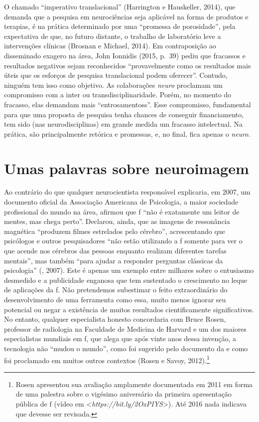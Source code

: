 O chamado ``imperativo translacional'' (Harrington e Hauskeller, 2014),
que demanda que a pesquisa em neurociências seja aplicável na forma de
produtos e terapias, é na prática determinado por uma ``promessa de
porosidade'', pela expectativa de que, no futuro distante, o trabalho de
laboratório leve a intervenções clínicas (Brosnan e Michael, 2014). Em
contraposição ao disseminado exagero na área, John Ionnidis (2015, p.~39)
pediu que fracassos e resultados negativos sejam reconhecidos
``provavelmente como os resultados mais úteis que os esforços de
pesquisa translacional podem oferecer''. Contudo, ninguém tem isso como
objetivo. As colaborações \emph{neuro} proclamam um compromisso com a
inter ou transdisciplinaridade. Porém, no momento do fracasso, elas
demandam mais ``entrosamentoss''. Esse compromisso, fundamental para que
uma proposta de pesquisa tenha chances de conseguir financiamento, tem
sido (nas neurodisciplinas) em grande medida um fracasso intelectual. Na
prática, são principalmente retórica e promessas, e, no final, fica
apenas o \emph{neuro}.

\section{Umas palavras sobre neuroimagem}

Ao contrário do que qualquer neurocientista responsável explicaria, em
2007, um documento oficial da Associação Americana de Psicologia, a maior
sociedade profissional do mundo na área, afirmou que f ``não é
exatamente um leitor de mentes, mas chega perto''. Declarou, ainda, que
as imagens de ressonância magnética ``produzem filmes estrelados pelo
cérebro'', acrescentando que psicólogos e outros pesquisadores ``não
estão utilizando a f somente para ver o que acende nos cérebros das
pessoas enquanto realizam diferentes tarefas mentais'', mas também
``para ajudar a responder perguntas clássicas da psicologia'' (,
2007). Este é apenas um exemplo entre milhares sobre o entusiasmo
desmedido e a publicidade enganosa que tem sustentado o crescimento no
leque de aplicações da f. Não pretendemos subestimar o feito
extraordinário do desenvolvimento de uma ferramenta como essa, muito
menos ignorar seu potencial ou negar a existência de muitos resultados
cientificamente significativos. No entanto, qualquer especialista
honesto concordaria com Bruce Rosen, professor de radiologia na
Faculdade de Medicina de Harvard e um dos maiores especialistas mundiais
em f, que alega que após vinte anos dessa invenção, a tecnologia não
``mudou o mundo'', como foi sugerido pelo documento da  e como foi
proclamado em muitos outros contextos (Rosen e Savoy,
2012).\footnote[8]{Rosen apresentou sua avaliação amplamente documentada em 2011 em
forma de uma palestra sobre o vigésimo aniversário da primeira
apresentação pública de f (vídeo em \textless{}\emph{https://bit.ly/2OxPIYS}\textgreater{}). Até 2016 nada indicava que
devesse ser revisada.}

